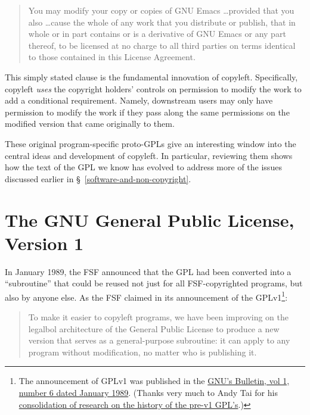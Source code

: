 \begin{quotation}
You may modify your copy or copies of GNU Emacs \ldots provided that you also
\ldots cause the whole of any work that you distribute or publish, that in
whole or in part contains or is a derivative of GNU Emacs or any part
thereof, to be licensed at no charge to all third parties on terms identical
to those contained in this License Agreement.
\end{quotation}

This simply stated clause is the fundamental innovation of copyleft.
Specifically, copyleft \textit{uses} the copyright holders' controls on
permission to modify the work to add a conditional requirement.  Namely,
downstream users may only have permission to modify  the work if they pass
along the same permissions on the modified version that came originally to
them.

These original program-specific proto-GPLs give an interesting window into
the central ideas and development of copyleft.  In particular, reviewing them
shows how the text of the GPL we know has evolved to address more of the
issues discussed earlier in \S~\ref{software-and-non-copyright}.

\section{The GNU General Public License, Version 1}
\label{GPLv1}

In January 1989, the FSF announced that the GPL had been converted into a
``subroutine'' that could be reused not just for all FSF-copyrighted
programs, but also by anyone else.  As the FSF claimed in its announcement of
the GPLv1\footnote{The announcement of GPLv1 was published in the
  \href{http://www.gnu.org/bulletins/bull6.html\#SEC8}{GNU's Bulletin, vol 1,
    number 6 dated January 1989}.  (Thanks very much to Andy Tai for his
  \href{http://www.free-soft.org/gpl_history/}{consolidation of research on
    the history of the pre-v1 GPL's}.)}:
\begin{quotation}
To make it easier to copyleft programs, we have been improving on the
legalbol architecture of the General Public License to produce a new version
that serves as a general-purpose subroutine: it can apply to any program
without modification, no matter who is publishing it.
\end{quotation}

